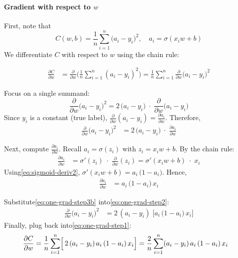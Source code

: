 \documentclass{article}
\begin{document}
\paragraph{Gradient with respect to \(w\)\\}\label{sec:grad-w-one-neuron}

\noindent First, note that
\[
    C(w, b) 
    = \frac{1}{n}\sum_{i=1}^{n} {\bigl(a_i - y_i\bigr)}^2,
    \quad
    a_i = \sigma(x_i w + b)
\]
We differentiate \(C\) with respect to \(w\) using the chain rule:

\begin{align}
    \frac{\partial C}{\partial w}
    &= \frac{\partial}{\partial w} \biggl(\frac{1}{n}\sum_{i=1}^{n} {(a_i - y_i)}^2\biggr)
    = \frac{1}{n} \sum_{i=1}^{n} \frac{\partial}{\partial w} {\bigl(a_i - y_i\bigr)}^2
    \label{eq:one-grad-step1}
\end{align}

\noindent Focus on a single summand:
\[
    \frac{\partial}{\partial w} {\bigl(a_i - y_i\bigr)}^2
    = 2\,\bigl(a_i - y_i\bigr)\;\cdot\; \frac{\partial}{\partial w}\bigl(a_i - y_i\bigr)
\]
Since \(y_i\) is a constant (true label), \(\frac{\partial}{\partial w}(a_i - y_i) = \frac{\partial a_i}{\partial w}\).  Therefore,
\begin{align}
    \frac{\partial}{\partial w} {\bigl(a_i - y_i\bigr)}^2
    &= 2\,\bigl(a_i - y_i\bigr)\;\cdot\;\frac{\partial a_i}{\partial w}
    \label{eq:one-grad-step2}
\end{align}

\noindent Next, compute \(\frac{\partial a_i}{\partial w}\).  Recall \(a_i = \sigma(z_i)\) with \(z_i = x_i w + b\).  By the chain rule:
\begin{align}
    \frac{\partial a_i}{\partial w}
    &= \sigma'(z_i)\;\cdot\;\frac{\partial}{\partial w}(z_i)
    = \sigma'(x_i w + b)\;\cdot\; x_i
    \label{eq:one-grad-step3a}
\end{align}
Using\eqref{eq:sigmoid-deriv2}, \(\sigma'(x_i w + b) = a_i\,\bigl(1 - a_i\bigr)\).  Hence,
\begin{align}
    \frac{\partial a_i}{\partial w}
    &= a_i\,\bigl(1 - a_i\bigr)\,x_i
    \label{eq:one-grad-step3b}
\end{align}

\noindent Substitute\eqref{eq:one-grad-step3b} into\eqref{eq:one-grad-step2}:
\begin{align}
    \frac{\partial}{\partial w} {\bigl(a_i - y_i\bigr)}^2
    &= 2\,(a_i - y_i)\;\bigl[a_i\,\bigl(1 - a_i\bigr)\,x_i\bigr]
\end{align}
Finally, plug back into\eqref{eq:one-grad-step1}:
\begin{align}
    \frac{\partial C}{\partial w}
    &= \frac{1}{n} \sum_{i=1}^{n} \Bigl[\,2\,(a_i - y_i)\,a_i\,(1 - a_i)\,x_i\Bigr]
    = \frac{2}{n} \sum_{i=1}^{n} (a_i - y_i)\,a_i\,(1 - a_i)\,x_i
    \label{eq:one-grad-w-final}
\end{align}
\end{document}
